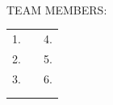 \documentclass[twoside,openany]{tufte-book}
\begin{document}
\pagebreak
\begin{flushleft} 
\textbf{} \\ 
 \end{flushleft}
 
 \vspace{12pt}
\noindent TEAM MEMBERS:\\ 
\vspace{12pt}
\begin{tabular}{p{2in}p{1in}p{2in}}
1. \hrulefill & & 4. \hrulefill  \\
2. \hrulefill & & 5. \hrulefill  \\
3. \hrulefill & & 6. \hrulefill  \\ \\ \\
\end{tabular}

\renewcommand{\labelenumi}{\arabic{enumi}.}
\end{document}

